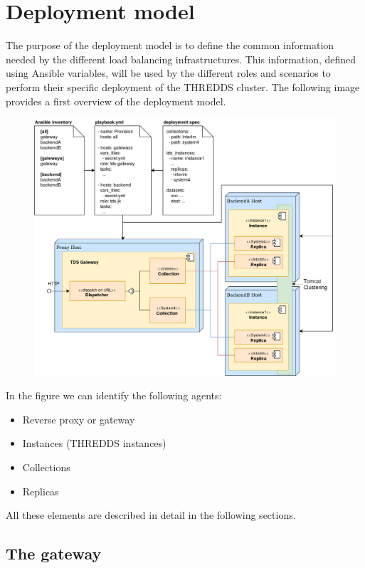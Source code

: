 \documentclass[a4paper,12pt]{article}
\begin{document}
\section{Deployment model}

The purpose of the deployment model is to define the common information needed by the different load balancing infrastructures. This information, defined using Ansible variables, will be used by the different roles and scenarios to perform their specific deployment of the THREDDS cluster. The following image provides a first overview of the deployment model.

\begin{figure}[h]
\includegraphics[width=1\textwidth]{images/overview.png}
\end{figure}

In the figure we can identify the following agents:

\begin{itemize}
\item Reverse proxy or gateway
\item Instances (THREDDS instances)
\item Collections
\item Replicas
\end{itemize}

All these elements are described in detail in the following sections.

\subsection{The gateway}
\end{document}
